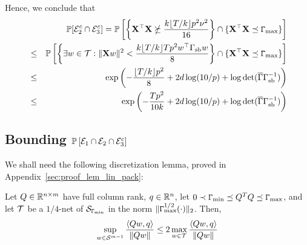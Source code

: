 Hence, we conclude that
\begin{eqnarray*}
&&\mathbb{P}[ \mathcal{E}_2^c \cap \mathcal{E}_3^c]= \mathbb{P}\left[\left\{ \mathbf{X}^\top\mathbf{X} \nsucceq \frac{k\lfloor T/k\rfloor p^2 \nu^2 }{16}\right\} \cap \{\mathbf{X}^\top\mathbf{X} \preceq \mathtt{\Gamma}_{\max}\}\right] \\
&\le& \mathbb{P}\left[ \left\{\exists w \in \mathcal{T} : \|\mathbf{X} w\|^2 < \frac{k\lfloor T/k\rfloor T p^2 w^\top\Gamma_{\mathrm{sb}} w }{8}\right\} \cap \{\mathbf{X}^\top\mathbf{X} \preceq \mathtt{\Gamma}_{\max}\}\right] \\
&\le&  \exp\left( - \frac{\lfloor T/k\rfloor p^2}{8}+ 2d\log(10/ p) +  \log \det (\overline{\Gamma} \Gamma_{\mathrm{sb}}^{-1}) \right)\\
&\le&  \exp\left( - \frac{Tp^2}{10k} + 2d\log(10/ p) +  \log \det (\overline{\Gamma} \Gamma_{\mathrm{sb}}^{-1})\right)
\end{eqnarray*}

\subsection{Bounding $\mathbb{P}\left[ \mathcal{E}_1 \cap \mathcal{E}_2 \cap \mathcal{E}_3^c \right]\label{app:main_noise}$}
We shall need the following discretization lemma, proved in Appendix~\ref{sec:proof_lem_lin_pack}:
\begin{lem}\label{lem:Lin_packing} Let $Q \in \mathbb{R}^{n\times m}$ have full column rank,
$q \in \mathbb{R}^n$, let $0 \prec \mathtt{\Gamma}_{\min} \preceq Q^TQ \preceq \mathtt{\Gamma}_{\max}$, and let $\mathcal{T}$ be a $1/4$-net of $\mathcal{S}_{\mathtt{\Gamma}_{\min}}$ in the norm $\|\mathtt{\Gamma}_{\max}^{1/2}(\cdot)\|_2$.
Then, 
\begin{eqnarray}\sup_{w \in \mathcal{S}^{m-1}} \frac{ \langle Q w,  q \rangle}{\|Q w\|} \le 2\max_{w \in \mathcal{T}}  \frac{ \langle Q w, q \rangle}{\|Q w\|}
\end{eqnarray}
\end{lem}

